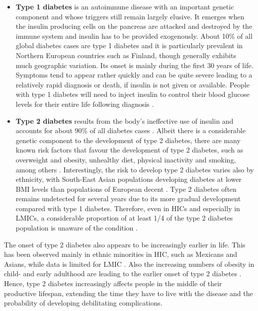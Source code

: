 \begin{itemize}
\item \textbf{Type 1 diabetes} is an autoimmune disease with an important genetic component and whose triggers still remain largely elusive. It emerges when the insulin producing cells on the pancreas are attacked and destroyed by the immune system and insulin has to be provided exogenously. About 10\% of all global diabetes cases are type 1 diabetes and it is particularly prevalent in Northern European countries such as Finland, though generally exhibits much geographic variation. Its onset is mainly during the first 30 years of life. Symptoms tend to appear rather quickly and can be quite severe leading to a relatively rapid diagnosis or death, if insulin is not given or available. People with type 1 diabetes will need to inject insulin to control their blood glucose levels for their entire life following diagnosis \parencite{Tuomilehto2013}. 
\item \textbf{Type 2 diabetes} results from the body's ineffective use of insulin and accounts for about 90\% of all diabetes cases \parencite{WorldHealthOrganization2016}. Albeit there is a considerable genetic component to the development of type 2 diabetes, there are many known risk factors that favour the development of type 2 diabetes, such as overweight and obesity, unhealthy diet, physical inactivity and smoking, among others \parencite{WorldHealthOrganization2016}. Interestingly, the risk to develop type 2 diabetes varies also by ethnicity, with South-East Asian populations developing diabetes at lower \ac{BMI} levels than populations of European decent \parencite{Ramachandran2010}. Type 2 diabetes often remains undetected for several years due to its more gradual development compared with type 1 diabetes. Therefore, even in \acp{HIC} and especially in \acp{LMIC}, a considerable proportion of at least 1/4 of the type 2 diabetes population is unaware of the condition \parencite{Beagley2014}. 
\end{itemize}

The onset of type 2 diabetes also appears to be increasingly earlier in life. This has been observed mainly in ethnic minorities in \acs{HIC}, such as Mexicans and Asians, while data is limited for \ac{LMIC} \parencite{FazeliFarsani2013}. Also the increasing numbers of obesity in child- and early adulthood are leading to the earlier onset of type 2 diabetes \parencite{Chen2012}. Hence, type 2 diabetes increasingly affects people in the middle of their productive lifespan, extending the time they have to live with the disease and the probability of developing debilitating complications.

